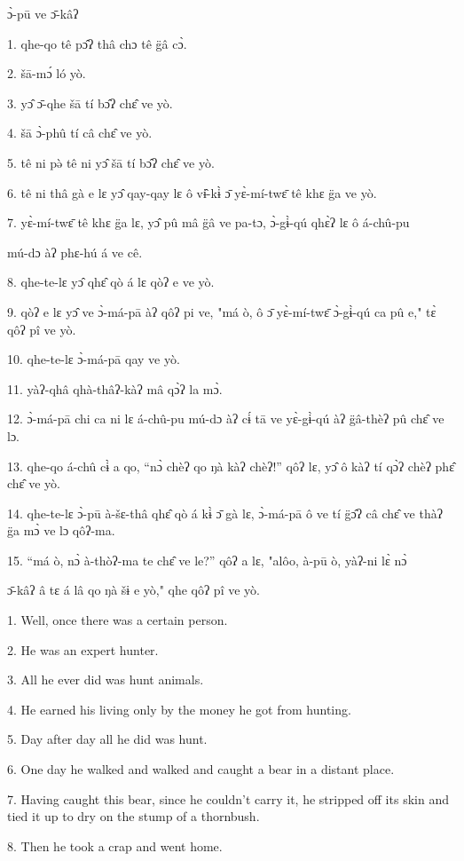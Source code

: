 \setcounter{footnote}{0}

ɔ̀-pū ve ɔ̄-kâʔ

1. qhe-qo tê pɔ̂ʔ thâ chɔ tê g̈â cɔ̀.

2. šā-mɔ́ ló yò.

3. yɔ̂ ɔ̄-qhe šā tí bɔ̂ʔ chɛ̂ ve yò.

4. šā ɔ̀-phû tí câ chɛ̂ ve yò.

5. tê ni pə̀ tê ni yɔ̂ šā tí bɔ̂ʔ chɛ̂ ve yò.

6. tê ni thâ gà e lɛ yɔ̂ qay-qay lɛ ô vɨ̂-kɨ̀ ɔ̄ yɛ̀-mí-twɛ̄
tê khɛ g̈a ve yò.

7. yɛ̀-mí-twɛ̄ tê khɛ g̈a lɛ, yɔ̂ pû mâ g̈â ve pa-tɔ, ɔ̀-gɨ̀-qú
qhɛ̀ʔ lɛ ô á-chû-pu

mú-dɔ àʔ phɛ-hú á ve cê.

8. qhe-te-lɛ yɔ̂ qhɛ̂ qò á lɛ qòʔ e ve yò.

9. qòʔ e lɛ yɔ̂ ve ɔ̀-má-pā àʔ qôʔ pi ve, "má ò, ô ɔ̄
yɛ̀-mí-twɛ̄ ɔ̀-gɨ̀-qú ca pû e," tɛ̀ qôʔ pî ve yò.

10. qhe-te-lɛ ɔ̀-má-pā qay ve yò.

11. yàʔ-qhâ qhà-thâʔ-kàʔ mâ qɔ̀ʔ la mɔ̀.

12. ɔ̀-má-pā chi ca ni lɛ á-chû-pu mú-dɔ àʔ cɨ́ tā ve yɛ̀-gɨ̀-qú
àʔ g̈â-thèʔ pû chɛ̂ ve lɔ.

13. qhe-qo á-chû cɨ̀ a qo, ``nɔ̀ chèʔ qo ŋà kàʔ chèʔ!''
qôʔ lɛ, yɔ̂ ô kàʔ tí qɔ̀ʔ chèʔ phɛ̂ chɛ̂ ve yò.

14. qhe-te-lɛ ɔ̀-pū à-šɛ-thâ qhɛ̂ qò á kɨ̀ ɔ̄ gà lɛ, ɔ̀-má-pā
ô ve tí g̈ɔ̂ʔ câ chɛ̂ ve thàʔ g̈a mɔ̀ ve lɔ qôʔ-ma.

15. ``má ò, nɔ̀ à-thòʔ-ma te chɛ̂ ve le?'' qôʔ a lɛ,
"alôo, à-pū ò, yàʔ-ni lɛ̀ nɔ̀

ɔ̄-kâʔ â tɛ á lâ qo ŋà šɨ e yò," qhe qôʔ pî ve yò.

1. Well, once there was a certain person.

2. He was an expert hunter.

3. All he ever did was hunt animals.

4. He earned his living only by the money he got from hunting.

5. Day after day all he did was hunt.

6. One day he walked and walked and caught a bear in a distant place.

7. Having caught this bear, since he couldn't carry it, he stripped off its skin
and tied it up to dry on the stump of a thornbush.

8. Then he took a crap and went home.

